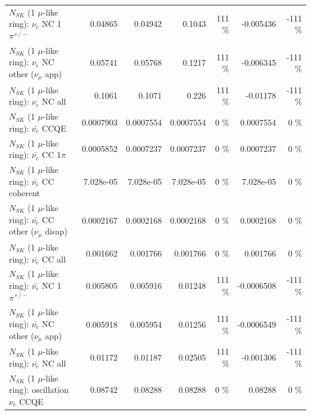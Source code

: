 \begin{table}
\begin{tabular}{| l | r | r | r  r | r  r |}
\hline
                           $N_{SK}$ (1 $\mu$-like ring): $\nu_e$ NC 1$\pi^{+/-}$ &         0.04865 &         0.04942 &          0.1043 &      111 \%  &       -0.005436 &     -111 \%  \\ 
                  $N_{SK}$ (1 $\mu$-like ring): $\nu_e$ NC other ($\nu_\mu$ app) &         0.05741 &         0.05768 &          0.1217 &      111 \%  &       -0.006345 &     -111 \%  \\ 
                                  $N_{SK}$ (1 $\mu$-like ring): $\nu_{e}$ NC all &          0.1061 &          0.1071 &           0.226 &      111 \%  &        -0.01178 &     -111 \%  \\ 
\hline
\hline
\hline
                                $N_{SK}$ (1 $\mu$-like ring): $\bar{\nu_e}$ CCQE &       0.0007903 &       0.0007554 &       0.0007554 &        0 \%  &       0.0007554 &        0 \%  \\ 
                           $N_{SK}$ (1 $\mu$-like ring): $\bar{\nu_e}$ CC 1$\pi$ &       0.0005852 &       0.0007237 &       0.0007237 &        0 \%  &       0.0007237 &        0 \%  \\ 
                         $N_{SK}$ (1 $\mu$-like ring): $\bar{\nu_e}$ CC coherent &       7.028e-05 &       7.028e-05 &       7.028e-05 &        0 \%  &       7.028e-05 &        0 \%  \\ 
          $N_{SK}$ (1 $\mu$-like ring): $\bar{\nu_e}$ CC other ($\nu_\mu$ disap) &       0.0002167 &       0.0002168 &       0.0002168 &        0 \%  &       0.0002168 &        0 \%  \\ 
                            $N_{SK}$ (1 $\mu$-like ring): $\bar{\nu_{e}}$ CC all &        0.001662 &        0.001766 &        0.001766 &        0 \%  &        0.001766 &        0 \%  \\ 
\hline
                     $N_{SK}$ (1 $\mu$-like ring): $\bar{\nu_e}$ NC 1$\pi^{+/-}$ &        0.005805 &        0.005916 &         0.01248 &      111 \%  &      -0.0006508 &     -111 \%  \\ 
            $N_{SK}$ (1 $\mu$-like ring): $\bar{\nu_e}$ NC other ($\nu_\mu$ app) &        0.005918 &        0.005954 &         0.01256 &      111 \%  &      -0.0006549 &     -111 \%  \\ 
                            $N_{SK}$ (1 $\mu$-like ring): $\bar{\nu_{e}}$ NC all &         0.01172 &         0.01187 &         0.02505 &      111 \%  &       -0.001306 &     -111 \%  \\ 
\hline
\hline
\hline
                          $N_{SK}$ (1 $\mu$-like ring): oscillation $\nu_e$ CCQE &         0.08742 &         0.08288 &         0.08288 &        0 \%  &         0.08288 &        0 \%  \\ 

\end{tabular}
\end{table}

